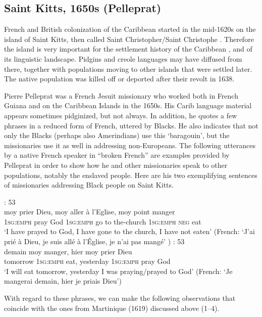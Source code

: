 \documentclass[output=paper,colorlinks,citecolor=brown]{langscibook}
\begin{document}
\subsection{Saint Kitts, 1650s (Pelleprat)} \label{sec:bakker:3.2}
 

French and British colonization of the Caribbean started in the mid-1620s on the island of Saint Kitts, then called Saint Christopher\slash Saint Christophe \citep{Parkvall1995, Jennings1995}. Therefore the island is very important for the settlement history of the Caribbean \citep{BakerBruyn1999}, and of its linguistic landscape. Pidgins and creole languages may have diffused from there, together with populations moving to other islands that were settled later. The native population was killed off or deported after their revolt in 1638.

Pierre Pelleprat was a French Jesuit missionary who worked both in French Guiana and on the Caribbean Islands in the 1650s. His Carib language material appears sometimes pidginized, but not always. In addition, he quotes a few phrases in a reduced form of French, uttered by Blacks. He also indicates that not only the Blacks (perhaps also Amerindians) use this `baragouin', but the missionaries use it as well in addressing non-Europeans. The following utterances by a native French speaker in “broken French” are examples provided by Pelleprat in order to show how he and other missionaries speak to other populations, notably the enslaved people. Here are his two exemplifying sentences of missionaries addressing Black people on Saint Kitts.

 
\ea \label{ex:bakker:7}
\citet{Pelleprat1655}: 53\\
\gll moy prier Dieu, moy aller à l’Eglise, moy point manger\\
    1\textsc{sg:emph} pray God 1\textsc{sg:emph} go to the-church 1\textsc{sg:emph} \textsc{neg} eat\\
\glt `I have prayed to God, I have gone to the church, I have not eaten'
 (French: `J’ai prié à Dieu, je suis allé à l’Église, je n’ai pas mangé' )
\ex \label{ex:bakker:8}
 \citealt{Pelleprat1655}: 53\\
\gll demain moy manger, hier moy prier Dieu\\
tomorrow 1\textsc{sg:emph} eat, yesterday 1\textsc{sg:emph} pray God\\
\glt `I will eat tomorrow, yesterday I was praying/prayed to God'
\glt (French: `Je mangerai demain, hier je priais Dieu')
\z 

With regard to these phrases, we can make the following observations that coincide with the ones from Martinique (1619) discussed above (1–4).
\end{document}
